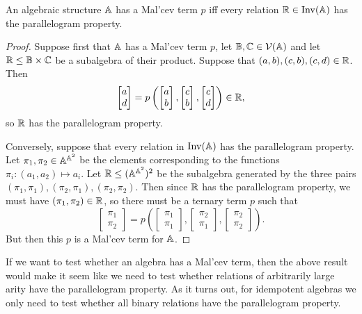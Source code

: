 \documentclass[letterpaper,11pt]{article}
\DeclareMathOperator{\Inv}{Inv}
\begin{document}
\begin{thm} An algebraic structure $\mathbb{A}$ has a Mal'cev term $p$ iff every relation $\RR \in \Inv(\bA)$ has the parallelogram property.
\end{thm}
\begin{proof} Suppose first that $\mathbb{A}$ has a Mal'cev term $p$, let $\mathbb{B}, \mathbb{C} \in \mathcal{V}(\mathbb{A})$ and let $\mathbb{R} \le \mathbb{B}\times \mathbb{C}$ be a subalgebra of their product. Suppose that $(a,b), (c,b), (c,d) \in \mathbb{R}$. Then
\[
\begin{bmatrix} a\\ d\end{bmatrix} = p\left(\begin{bmatrix} a\\ b\end{bmatrix}, \begin{bmatrix} c\\ b\end{bmatrix}, \begin{bmatrix} c\\ d\end{bmatrix}\right) \in \mathbb{R},
\]
so $\mathbb{R}$ has the parallelogram property.

Conversely, suppose that every relation in $\Inv(\bA)$ has the parallelogram property. Let $\pi_1, \pi_2 \in \mathbb{A}^{\mathbb{A}^2}$ be the elements corresponding to the functions $\pi_i : (a_1,a_2) \mapsto a_i$. Let $\mathbb{R} \le (\mathbb{A}^{\mathbb{A}^2})^2$ be the subalgebra generated by the three pairs $(\pi_1,\pi_1), (\pi_2,\pi_1), (\pi_2,\pi_2)$. Then since $\mathbb{R}$ has the parallelogram property, we must have $(\pi_1,\pi_2) \in \mathbb{R}$, so there must be a ternary term $p$ such that
\[
\begin{bmatrix} \pi_1\\ \pi_2\end{bmatrix} = p\left(\begin{bmatrix} \pi_1\\ \pi_1\end{bmatrix}, \begin{bmatrix} \pi_2\\ \pi_1\end{bmatrix}, \begin{bmatrix} \pi_2\\ \pi_2\end{bmatrix}\right).
\]
But then this $p$ is a Mal'cev term for $\mathbb{A}$.
\end{proof}

If we want to test whether an algebra has a Mal'cev term, then the above result would make it seem like we need to test whether relations of arbitrarily large arity have the parallelogram property. As it turns out, for idempotent algebras we only need to test whether all binary relations have the parallelogram property.
\end{document}
